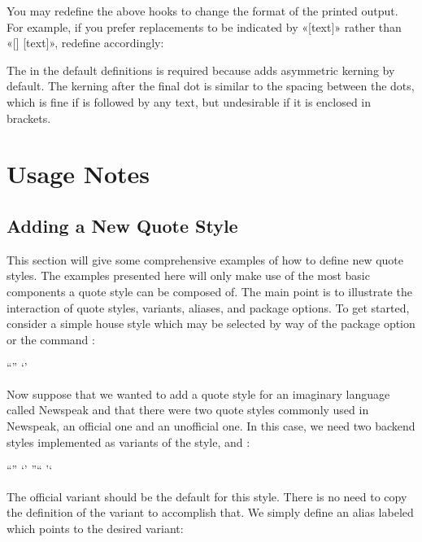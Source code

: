 \documentclass{ltxdockit}[2010/09/26]
\begin{document}
\begin{ltxcode}[showspaces=true]
\newcommand{<<\mktextins>>}[1]{[#1]}
\newcommand{<<\mktextmod>>}[1]{[#1]}
\end{ltxcode}
%
You may redefine the above hooks to change the format of the printed output. For example, if you prefer replacements to be indicated by «[\textellipsis text]» rather than «[\textellipsis\unkern] [text]», redefine  accordingly:

\begin{ltxcode}
\newcommand{<<\mktextelpins>>}[1]{[\textellipsis #1]}
\end{ltxcode}
%
The  in the default definitions is required because  adds asymmetric kerning by default. The kerning after the final dot is similar to the spacing between the dots, which is fine if  is followed by any text, but undesirable if it is enclosed in brackets.

\section{Usage Notes}
\label{use}

\subsection{Adding a New Quote Style}
\label{use:spl}

This section will give some comprehensive examples of how to define new quote styles. The examples presented here will only make use of the most basic components a quote style can be composed of. The main point is to illustrate the interaction of quote styles, variants, aliases, and package options. To get started, consider a simple house style which may be selected by way of the package option  or the command :

\begin{ltxcode}
  {\textquotedblleft}{\textquotedblright}
  {\textquoteleft}{\textquoteright}
\end{ltxcode}
%
Now suppose that we wanted to add a quote style for an imaginary language called Newspeak and that there were two quote styles commonly used in Newspeak, an official one and an unofficial one. In this case, we need two backend styles implemented as variants of the  style,  and :

\begin{ltxcode}
  {\textquotedblleft}{\textquotedblright}
  {\textquoteleft}{\textquoteright}
  {\textquotedblright}{\textquotedblleft}
  {\textquoteright}{\textquoteleft}
\end{ltxcode}
%
The official variant should be the default for this style. There is no need to copy the definition of the  variant to accomplish that. We simply define an alias labeled  which points to the desired variant:
\end{document}
